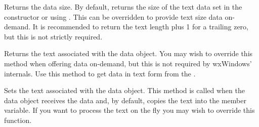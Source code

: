\label{wxtextdataobjectgettextlength}


Returns the data size. By default, returns the size of the text data
set in the constructor or using .
This can be overridden to provide text size data on-demand. It is recommended
to return the text length plus 1 for a trailing zero, but this is not
strictly required.

\label{wxtextdataobjectgettext}


Returns the text associated with the data object. You may wish to override
this method when offering data on-demand, but this is not required by
wxWindows' internals. Use this method to get data in text form from
the .

\label{wxtextdataobjectsettext}


Sets the text associated with the data object. This method is called
when the data object receives the data and, by default, copies the text into
the member variable. If you want to process the text on the fly you may wish to
override this function.


